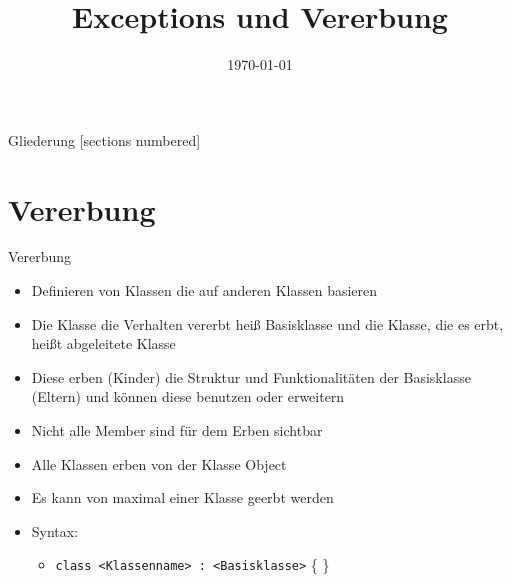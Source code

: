 



\title{Exceptions und Vererbung}
\date{\today}




\maketitle

\begin{frame}{Gliederung}
	[sections numbered]
	\tableofcontents
\end{frame}

\section{Vererbung}
\begin{frame}{Vererbung}
	\begin{itemize}
		\item Definieren von Klassen die auf anderen Klassen basieren
		\item Die Klasse die Verhalten vererbt heiß \alert{Basisklasse} und die Klasse, die es erbt, heißt \alert{abgeleitete Klasse}
		\item Diese erben (Kinder) die Struktur und Funktionalitäten der Basisklasse (Eltern) und können diese benutzen oder erweitern
		\item Nicht alle Member sind für dem Erben sichtbar
		\item Alle Klassen erben von der Klasse \alert{Object}
		\item Es kann von maximal einer Klasse geerbt werden
		\item Syntax:
		\begin{itemize}
			\item \texttt{class \alert{<Klassenname>} : \alert{<Basisklasse>}} \{ \}
		\end{itemize}
	\end{itemize}
	
\end{frame}

